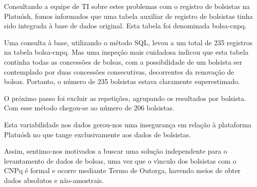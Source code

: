 \documentclass[
12pt,		%
openright,	%
twoside,  %
a4paper,			%
chapter=TITLE,		%
english,			%
french,				%
spanish,			%
brazil				%
]{USPSC-classe/USPSC}
\begin{document}
Consultando a equipe de TI sobre estes problemas com o registro de bolsistas na Platu\'osh, fomos informados que uma tabela auxiliar de registro de bolsistas tinha sido integrada \`a base de dados original. Esta tabela foi denominada \textquotedbl bolsa-cnpq\textquotedbl .

















Uma consulta \`a base, utilizando o m\'etodo SQL, levou a um total de 235 registros na tabela \textquotedbl bolsa-cnpq\textquotedbl . Mas uma inspe\c{c}\~ao mais cuidadosa indicou que esta tabela continha todas as concess\~oes de bolsas, com a possibilidade de um bolsista ser contemplado por duas concess\~oes consecutivas, decorrentes da renova\c{c}\~ao de bolsas. Portanto, o n\'umero de 235 bolsistas estava claramente superestimado.

















O pr\'oximo passo foi excluir as repeti\c{c}\~oes, agrupando os resultados por bolsista. Com esse m\'etodo chegou-se ao n\'umero de 206 bolsistas.

















Esta variabilidade nos dados gerou-nos uma inseguran\c{c}a em rela\c{c}\~ao \`a plataforma Platu\'osh no que tange exclusivamente aos dados de bolsistas.

















Assim, sentimo-nos motivados a buscar uma solu\c{c}\~ao independente para o levantamento de dados de bolsas, uma vez que o v\'{\i}nculo dos bolsistas com o CNPq \'e formal e ocorre mediante Termo de Outorga, havendo meios de obter dados absolutos e n\~ao-amostrais.
\end{document}
